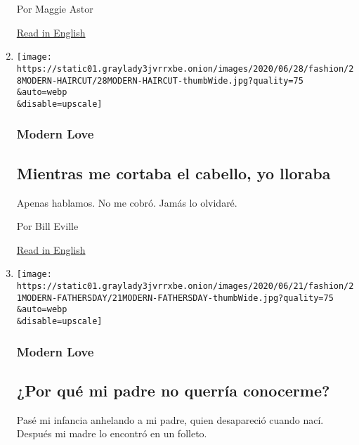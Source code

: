 \begin{enumerate}
  Por Maggie Astor

  \href{https://www.nytimes3xbfgragh.onion/2020/05/27/smarter-living/how-to-recover-from-covid-19-at-home.html}{Read
  in English}
\item
  \href{/es/2020/07/05/espanol/estilos-de-vida/cancer-cabello.html}{}

  \texttt{[image: https://static01.graylady3jvrrxbe.onion/images/2020/06/28/fashion/28MODERN-HAIRCUT/28MODERN-HAIRCUT-thumbWide.jpg?quality=75\\\&auto=webp\\\&disable=upscale]}

  \hypertarget{modern-love-2}{%
  \subsubsection{Modern Love}\label{modern-love-2}}

  \hypertarget{mientras-me-cortaba-el-cabello-yo-lloraba}{%
  \subsection{Mientras me cortaba el cabello, yo
  lloraba}\label{mientras-me-cortaba-el-cabello-yo-lloraba}}

  Apenas hablamos. No me cobró. Jamás lo olvidaré.

  Por Bill Eville

  \href{https://www.nytimes3xbfgragh.onion/2020/06/26/style/modern-love-coronavirus-as-he-cut-my-hair-i-wept.html}{Read
  in English}
\item
  \href{/es/2020/06/28/espanol/estilos-de-vida/por-que-mi-padre-no-querria-conocerme.html}{}

  \texttt{[image: https://static01.graylady3jvrrxbe.onion/images/2020/06/21/fashion/21MODERN-FATHERSDAY/21MODERN-FATHERSDAY-thumbWide.jpg?quality=75\\\&auto=webp\\\&disable=upscale]}

  \hypertarget{modern-love-3}{%
  \subsubsection{Modern Love}\label{modern-love-3}}

  \hypertarget{por-quuxe9-mi-padre-no-querruxeda-conocerme}{%
  \subsection{¿Por qué mi padre no querría
  conocerme?}\label{por-quuxe9-mi-padre-no-querruxeda-conocerme}}

  Pasé mi infancia anhelando a mi padre, quien desapareció cuando nací.
  Después mi madre lo encontró en un folleto.


\end{enumerate}
